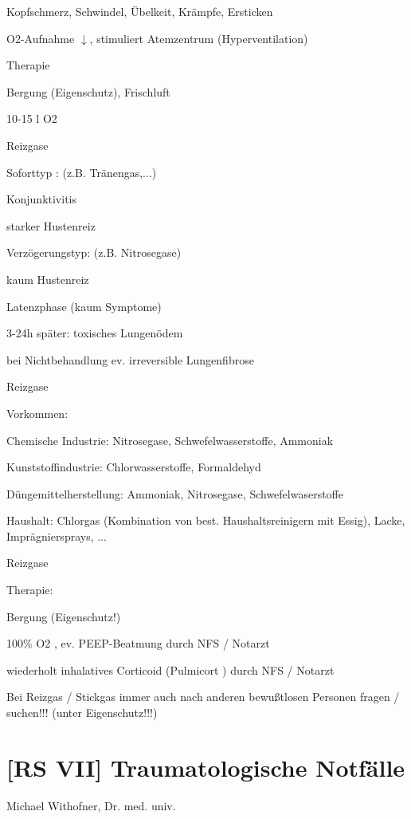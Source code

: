 \documentclass{article}
\begin{document}
Kopfschmerz, Schwindel, \"Ubelkeit, Kr\"ampfe, Ersticken

O2-Aufnahme ${\downarrow}$, stimuliert Atemzentrum (Hyperventilation)

Therapie

Bergung (Eigenschutz), Frischluft

10-15 l O2  

Reizgase

Soforttyp : (z.B. Tr\"anengas,...)

Konjunktivitis

starker Hustenreiz

Verz\"ogerungstyp: (z.B. Nitrosegase)

kaum Hustenreiz

Latenzphase (kaum Symptome)

3-24h sp\"ater: toxisches Lungen\"odem

bei Nichtbehandlung ev. irreversible Lungenfibrose

Reizgase

Vorkommen:

Chemische Industrie: Nitrosegase,  Schwefelwasserstoffe, Ammoniak

 Kunststoffindustrie: Chlorwasserstoffe,  Formaldehyd

D\"ungemittelherstellung: Ammoniak,  Nitrosegase, Schwefelwaserstoffe

Haushalt: Chlorgas (Kombination von best.  Haushaltsreinigern mit
Essig), Lacke,  Impr\"agniersprays, ...

Reizgase

Therapie:

Bergung (Eigenschutz!)

100\% O2 , ev. PEEP-Beatmung durch NFS /  Notarzt

wiederholt inhalatives Corticoid (Pulmicort{\textregistered} )  durch
NFS / Notarzt

Bei Reizgas / Stickgas immer auch nach  anderen bewu{\ss}tlosen Personen
fragen /  suchen!!! (unter Eigenschutz!!!)

\section{[RS VII] Traumatologische Notf\"alle}
Michael Withofner, Dr. med. univ.
\end{document}
